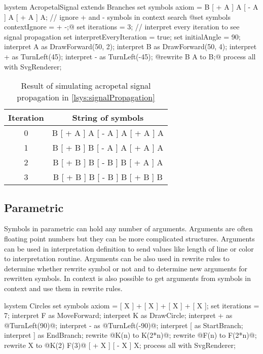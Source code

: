\begin{Lsystem}[label=lsys:signalPropagation,caption={\lsystem simulating acropetal signal propagation (\autoref{fig:acropetalSignal})}]
lsystem AcropetalSignal extends Branches {
	set symbols axiom = B [ + A ] A [ - A ] A [ + A ] A;
	// ignore + and - symbols in context search
	@set symbols contextIgnore = + -;@
	set iterations = 3;
	// interpret every iteration to see signal propagation
	set interpretEveryIteration = true;
	set initialAngle = 90;
	interpret A as DrawForward(50, 2);
	interpret B as DrawForward(50, 4);
	interpret + as TurnLeft(45);
	interpret - as TurnLeft(-45);
	@rewrite { B } A to B;@
}
process all with SvgRenderer;
\end{Lsystem}


\begin{table}[h]
	\centering
	\begin{tabular}{c c}
   		\toprule
   		Iteration & String of symbols \\
   		\midrule
		0 & B [ + A ] A [ - A ] A [ + A ] A \\
		1 & B [ + B ] B [ - A ] A [ + A ] A \\
		2 & B [ + B ] B [ - B ] B [ + A ] A \\
		3 & B [ + B ] B [ - B ] B [ + B ] B \\
		\bottomrule
	\end{tabular}
	\caption{Result of \lsystem simulating acropetal signal propagation in \autoref{lsys:signalPropagation}}
	\label{fig:signalPropagationTable}
\end{table}


\subsection{Parametric \lsystems}

Symbols in parametric \lsystems can hold any number of arguments.
Arguments are often floating point numbers but they can be more complicated structures.
Arguments can be used in interpretation definition to send values like length of line or color to interpretation routine.
Arguments can be also used in rewrite rules to determine whether rewrite symbol or not and to determine new arguments for rewritten symbols.
In context \twolsystems is also possible to get arguments from symbols in context and use them in rewrite rules.



\newsavebox{\lstBox}
\begin{lrbox}{\lstBox}
\begin{Lsystem50}
lsystem Circles {
	set symbols axiom =	[ X ] +
		[ X ] + [ X ] + [ X ];
	set iterations = 7;
	interpret F as MoveForward;
	interpret K as DrawCircle;
	interpret + as @TurnLeft(90)@;
	interpret - as @TurnLeft(-90)@;
	interpret [ as StartBranch;
	interpret ] as EndBranch;
	rewrite @K(n) to K(2*n)@;
	rewrite @F(n) to F(2*n)@;
	rewrite X to @K(2) F(3)@
		[ + X ] [ - X ] X;
}
process all with SvgRenderer;
\end{Lsystem50}
\end{lrbox}


